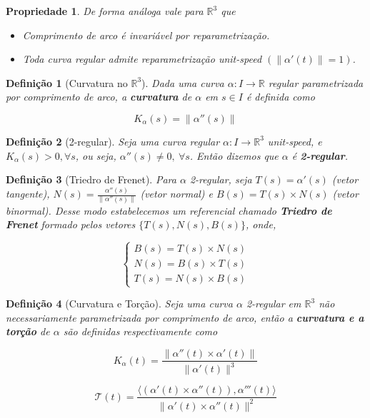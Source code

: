 \documentclass{article}
\newtheorem{prop}{Propriedade}
\newtheorem{definition}{Definição}
\begin{document}
\begin{prop} De forma análoga vale para $\mathbb{R}^3$ que
\begin{itemize}
    \item Comprimento de arco é invariável por reparametrização.
    
    \item Toda curva regular admite reparametrização \textit{unit-speed} $(\| \alpha'(t) \| = 1)$.
\end{itemize}
\end{prop}

\begin{definition}[Curvatura no $\mathbb{R}^3$]
Dada uma curva $\alpha: I \rightarrow \mathbb{R}$ regular parametrizada por comprimento de arco, a \textbf{curvatura} de $\alpha$ em $s \in I$ é definida como

$$K_\alpha(s) = \| \alpha''(s) \|$$
\end{definition}

\begin{definition}[2-regular]
Seja uma curva regular $\alpha: I \rightarrow \mathbb{R}^3$ \textit{unit-speed}, e $K_\alpha(s) > 0, \forall s$, ou seja, $\alpha''(s) \neq 0,\ \forall s$. Então dizemos que $\alpha$ é \textbf{2-regular}.
\end{definition}

\begin{definition}[Triedro de Frenet]
Para $\alpha$ 2-regular, seja $T(s) = \alpha'(s)$ (vetor tangente), $N(s) = \frac{\alpha''(s)}{\| \alpha''(s) \|}$ (vetor normal) e $B(s) = T(s) \times N(s)$ (vetor binormal). Desse modo estabelecemos um referencial chamado \textbf{Triedro de Frenet} formado pelos vetores $\{ T(s), N(s), B(s) \}$, onde,

$$ \left \{
\begin{array}{lll}
    B(s) = T(s) \times N(s) \\
    N(s) = B(s) \times T(s) \\
    T(s) = N(s) \times B(s)
\end{array} \right .
$$
\end{definition}

\begin{definition}[Curvatura e Torção]
Seja uma curva $\alpha$ 2-regular em $\mathbb{R}^3$ não necessariamente parametrizada por comprimento de arco, então a \textbf{curvatura e a torção} de $\alpha$ são definidas respectivamente como

$$K_\alpha(t) = \frac{\| \alpha''(t) \times \alpha'(t) \|}{\| \alpha'(t) \|^3}$$

$$\mathcal{T}(t) = \frac{\langle (\alpha'(t) \times \alpha''(t)), \alpha'''(t) \rangle}{\| \alpha'(t) \times \alpha''(t) \|^2}$$
\end{definition}
\end{document}
